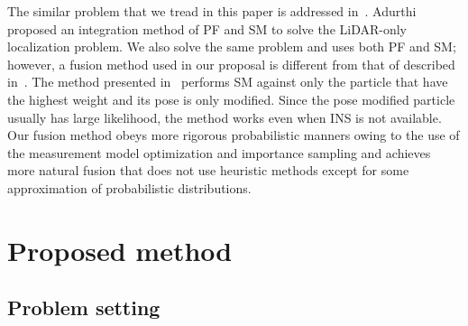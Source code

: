 \documentclass[letterpaper, 10 pt, conference]{ieeeconf}  %
\begin{document}
The similar problem that we tread in this paper is addressed in~\cite{https://doi.org/10.48550/arxiv.2302.06843}.
Adurthi proposed an integration method of PF and SM to solve the LiDAR-only localization problem.
We also solve the same problem and uses both PF and SM; however, a fusion method used in our proposal is different from that of described in~\cite{https://doi.org/10.48550/arxiv.2302.06843}.
The method presented in~\cite{https://doi.org/10.48550/arxiv.2302.06843} performs SM against only the particle that have the highest weight and its pose is only modified.
Since the pose modified particle usually has large likelihood, the method works even when INS is not available.
Our fusion method obeys more rigorous probabilistic manners owing to the use of the measurement model optimization and importance sampling and achieves more natural fusion that does not use heuristic methods except for some approximation of probabilistic distributions.
























\section{Proposed method}
\label{sec:proposed_method}

\subsection{Problem setting}
\end{document}

